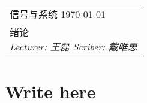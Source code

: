 \documentclass[10pt]{article}
\begin{document}
\noindent\begin{tabularx}{\linewidth}{|X|}
\hline
{\sf 信号与系统} \hfill \today \\
{\centering \sf \large
绪论 \\ }
\textit{Lecturer: 王磊 \hfill Scriber: 戴唯思} \\ \hline
\end{tabularx}

\section{Write here}
\end{document}
